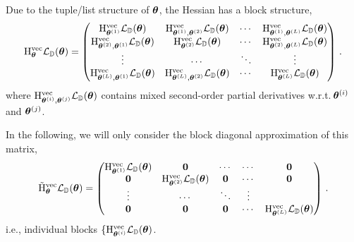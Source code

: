 Due to the tuple/list structure of ${\bm{\theta}}$, the Hessian has a block structure,
\begin{align*}
  \mathrm{H}_{{\bm{\theta}}}^{\operatorname{vec}} {\mathcal{L}}_{{\mathbb{D}}}({\bm{\theta}})
  =
  \begin{pmatrix}
    \mathrm{H}_{{\bm{\theta}}^{(1)}}^{\operatorname{vec}} {\mathcal{L}}_{{\mathbb{D}}}({\bm{\theta}})
    &
      \mathrm{H}_{{\bm{\theta}}^{(1)}, {\bm{\theta}}^{(2)}}^{\operatorname{vec}} {\mathcal{L}}_{{\mathbb{D}}}({\bm{\theta}})
    &
      \cdots
    &
      \mathrm{H}_{{\bm{\theta}}^{(1)}, {\bm{\theta}}^{(L)}}^{\operatorname{vec}} {\mathcal{L}}_{{\mathbb{D}}}({\bm{\theta}})
    \\
    \mathrm{H}_{{\bm{\theta}}^{(2)}, {\bm{\theta}}^{(1)}}^{\operatorname{vec}} {\mathcal{L}}_{{\mathbb{D}}}({\bm{\theta}})
    &
      \mathrm{H}_{{\bm{\theta}}^{(2)}}^{\operatorname{vec}} {\mathcal{L}}_{{\mathbb{D}}}({\bm{\theta}})
    &
      \cdots
    &
      \mathrm{H}_{{\bm{\theta}}^{(2)}, {\bm{\theta}}^{(L)}}^{\operatorname{vec}} {\mathcal{L}}_{{\mathbb{D}}}({\bm{\theta}})
    \\
    \vdots & \cdots & \ddots & \vdots
    \\
    \mathrm{H}_{{\bm{\theta}}^{(L)}, {\bm{\theta}}^{(1)}}^{\operatorname{vec}} {\mathcal{L}}_{{\mathbb{D}}}({\bm{\theta}})
    &
      \mathrm{H}_{{\bm{\theta}}^{(L)}, {\bm{\theta}}^{(2)}}^{\operatorname{vec}} {\mathcal{L}}_{{\mathbb{D}}}({\bm{\theta}})
    &
      \cdots
    &
      \mathrm{H}_{{\bm{\theta}}^{(L)}}^{\operatorname{vec}} {\mathcal{L}}_{{\mathbb{D}}}({\bm{\theta}})
  \end{pmatrix}\,.
\end{align*}
where $\mathrm{H}_{{\bm{\theta}}^{(i)}, {\bm{\theta}}^{(j)}}^{\operatorname{vec}} {\mathcal{L}}_{{\mathbb{D}}}({\bm{\theta}})$ contains mixed second-order partial derivatives w.r.t.\,${\bm{\theta}}^{(i)}$ and ${\bm{\theta}}^{(j)}$.

In the following, we will only consider the block diagonal approximation of this matrix,
\begin{align*}
  \tilde{\mathrm{H}}_{{\bm{\theta}}}^{\operatorname{vec}} {\mathcal{L}}_{{\mathbb{D}}}({\bm{\theta}})
  =
  \begin{pmatrix}
    \mathrm{H}_{{\bm{\theta}}^{(1)}}^{\operatorname{vec}} {\mathcal{L}}_{{\mathbb{D}}}({\bm{\theta}})
    &
      {\bm{0}}
    &
      \cdots
    &
      \cdots
    &
      {\bm{0}}
    \\
    {\bm{0}}
    &
      \mathrm{H}_{{\bm{\theta}}^{(2)}}^{\operatorname{vec}} {\mathcal{L}}_{{\mathbb{D}}}({\bm{\theta}})
    &
      {\bm{0}}
    &
      \cdots
    &
      {\bm{0}}
    \\
    \vdots & \cdots & \ddots & \vdots
    \\
    {\bm{0}}
    &
      {\bm{0}}
    &
      {\bm{0}}
    &
      \cdots
      &
      \mathrm{H}_{{\bm{\theta}}^{(L)}}^{\operatorname{vec}} {\mathcal{L}}_{{\mathbb{D}}}({\bm{\theta}})
  \end{pmatrix}\,.
\end{align*}
i.e., individual blocks $\{ \mathrm{H}_{{\bm{\theta}}^{(i)}}^{\operatorname{vec}} {\mathcal{L}}_{{\mathbb{D}}}({\bm{\theta}})$.


